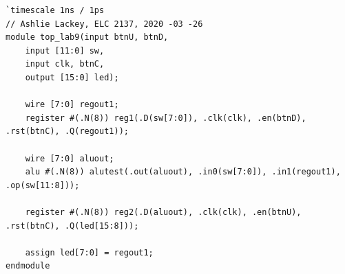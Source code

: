 \documentclass[11pt]{article}
\begin{document}
\begin{lstlisting}[style=Verilog,caption= top-lab9 Verilog Code,label=code:ex ]
`timescale 1ns / 1ps
// Ashlie Lackey, ELC 2137, 2020 -03 -26
module top_lab9(input btnU, btnD,
	input [11:0] sw,
	input clk, btnC,
	output [15:0] led);
	
	wire [7:0] regout1;
	register #(.N(8)) reg1(.D(sw[7:0]), .clk(clk), .en(btnD), .rst(btnC), .Q(regout1));
	
	wire [7:0] aluout;
	alu #(.N(8)) alutest(.out(aluout), .in0(sw[7:0]), .in1(regout1), .op(sw[11:8]));
	
	register #(.N(8)) reg2(.D(aluout), .clk(clk), .en(btnU), .rst(btnC), .Q(led[15:8]));
	
	assign led[7:0] = regout1;
endmodule
\end{lstlisting}
\end{document}
